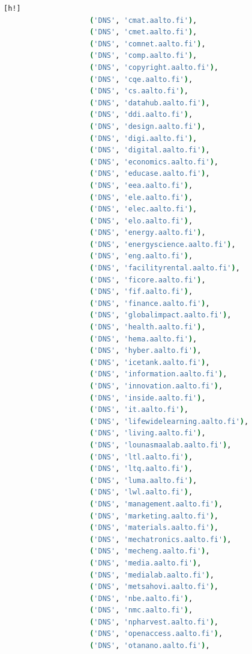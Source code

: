 \begin{lstlisting}[language=bash, caption= A TLS handshake connecting to
    \url{www.aalto.fi}., label={lst:handshake_aalto}][h!]
                    ('DNS', 'cmat.aalto.fi'),
                    ('DNS', 'cmet.aalto.fi'),
                    ('DNS', 'comnet.aalto.fi'),
                    ('DNS', 'comp.aalto.fi'),
                    ('DNS', 'copyright.aalto.fi'),
                    ('DNS', 'cqe.aalto.fi'),
                    ('DNS', 'cs.aalto.fi'),
                    ('DNS', 'datahub.aalto.fi'),
                    ('DNS', 'ddi.aalto.fi'),
                    ('DNS', 'design.aalto.fi'),
                    ('DNS', 'digi.aalto.fi'),
                    ('DNS', 'digital.aalto.fi'),
                    ('DNS', 'economics.aalto.fi'),
                    ('DNS', 'educase.aalto.fi'),
                    ('DNS', 'eea.aalto.fi'),
                    ('DNS', 'ele.aalto.fi'),
                    ('DNS', 'elec.aalto.fi'),
                    ('DNS', 'elo.aalto.fi'),
                    ('DNS', 'energy.aalto.fi'),
                    ('DNS', 'energyscience.aalto.fi'),
                    ('DNS', 'eng.aalto.fi'),
                    ('DNS', 'facilityrental.aalto.fi'),
                    ('DNS', 'ficore.aalto.fi'),
                    ('DNS', 'fif.aalto.fi'),
                    ('DNS', 'finance.aalto.fi'),
                    ('DNS', 'globalimpact.aalto.fi'),
                    ('DNS', 'health.aalto.fi'),
                    ('DNS', 'hema.aalto.fi'),
                    ('DNS', 'hyber.aalto.fi'),
                    ('DNS', 'icetank.aalto.fi'),
                    ('DNS', 'information.aalto.fi'),
                    ('DNS', 'innovation.aalto.fi'),
                    ('DNS', 'inside.aalto.fi'),
                    ('DNS', 'it.aalto.fi'),
                    ('DNS', 'lifewidelearning.aalto.fi'),
                    ('DNS', 'living.aalto.fi'),
                    ('DNS', 'lounasmaalab.aalto.fi'),
                    ('DNS', 'ltl.aalto.fi'),
                    ('DNS', 'ltq.aalto.fi'),
                    ('DNS', 'luma.aalto.fi'),
                    ('DNS', 'lwl.aalto.fi'),
                    ('DNS', 'management.aalto.fi'),
                    ('DNS', 'marketing.aalto.fi'),
                    ('DNS', 'materials.aalto.fi'),
                    ('DNS', 'mechatronics.aalto.fi'),
                    ('DNS', 'mecheng.aalto.fi'),
                    ('DNS', 'media.aalto.fi'),
                    ('DNS', 'medialab.aalto.fi'),
                    ('DNS', 'metsahovi.aalto.fi'),
                    ('DNS', 'nbe.aalto.fi'),
                    ('DNS', 'nmc.aalto.fi'),
                    ('DNS', 'npharvest.aalto.fi'),
                    ('DNS', 'openaccess.aalto.fi'),
                    ('DNS', 'otanano.aalto.fi'),

\end{lstlisting}
